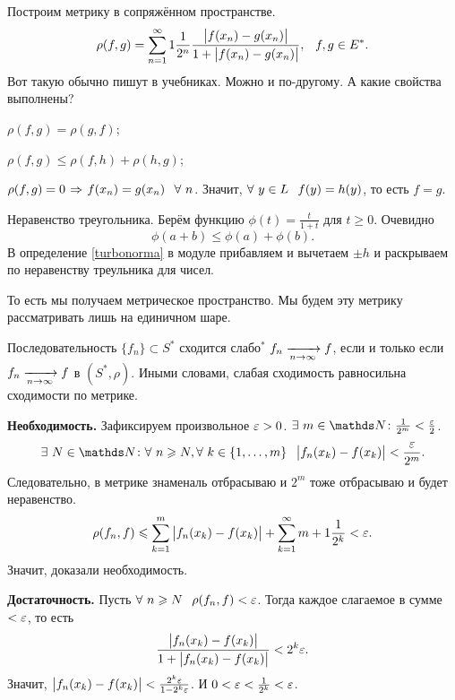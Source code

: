 Построим метрику в сопряжённом пространстве.
\begin{equation}\label{turbonorma}
  \rho(f,g) = \sum\limits_{{n}={1}}^\infty1\frac1{2^n}\frac{\big|f(x_n) - g(x_n)\big|}{1+\big|f(x_n) - g(x_n)\big|},\hskip .75em plus.1em minus.08em\relax f,g\in E^*.
\end{equation}
Вот такую обычно пишут в учебниках. Можно и по-другому. А какие свойства выполнены?
\begin{roItems}
  \item $\rho(f,g) = \rho(g,f)$;
  \item $\rho(f,g)\le \rho(f,h)+\rho(h,g)$;
  \item $\rho(f,g) = 0\imp f(x_n) = g(x_n)\pau\forall\ n$. Значит, $\forall\ y\in L\pau f(y) = h(y)$, то есть $f=g$.
\end{roItems}
\begin{Proof}
  Неравенство треугольника.  Берём функцию $\phi(t) = \frac t{1+t}$ для $t\ge0$. Очевидно
\[
  \phi(a+b)\le \phi(a)+\phi(b).
\]
В определение \eqref{turbonorma} в модуле прибавляем и вычетаем $\pm h$ и раскрываем по неравенству треульника для чисел.
\end{Proof}
То есть мы получаем метрическое пространство. Мы будем эту метрику рассматривать лишь на единичном шаре.
\begin{Lem}
  Последовательность $\{f_n\}\subset S^*$ сходится слабо${}^*$ $f_n\xrightarrow[n\rightarrow\infty]{} f$, если и только если $f_n\xrightarrow[n\rightarrow\infty]{} f$ в $(S^*,\rho)$. Иными словами, слабая сходимость равносильна сходимости по метрике.
\end{Lem}
\begin{Proof}
  \textbf{Необходимость.} Зафиксируем произвольное $\varepsilon>0$. $\exists\ m\in \N\colon \frac1{2^m}<\frac\e2$.
\[
  \exists\ N\in\N\colon \forall\ n\ge N,\forall\ k\in\{1,\dots,m\}\pau \big|f_n(x_k) - f(x_k)\big|<\frac\e{2^m}.
\]
Следовательно, в метрике знаменаль отбрасываю и $2^m$ тоже отбрасываю и будет неравенство.
\[
  \rho(f_n,f)\leqslant \sum\limits_{k = 1}^{m}\big|f_n(x_k) - f(x_k)\big| + \sum\limits_{{k}={1}}^\infty{m+1}\frac1{2^k}<\varepsilon.
\]
Значит, доказали необходимость.

\textbf{Достаточность.} Пусть $\forall\ n\ge N\pau \rho(f_n,f)<\e$. Тогда каждое слагаемое в сумме $<\varepsilon$, то есть
\[
  \frac{\big|f_n(x_k) - f(x_k)\big|}{1+\big|f_n(x_k) - f(x_k)\big|}<2^k\varepsilon.
\]
Значит, $\big|f_n(x_k)-f(x_k)\big|<\frac{2^k\varepsilon}{1-2^k\varepsilon}$. И $0<\varepsilon<\frac1{2^k}<\varepsilon$.
\end{Proof}

